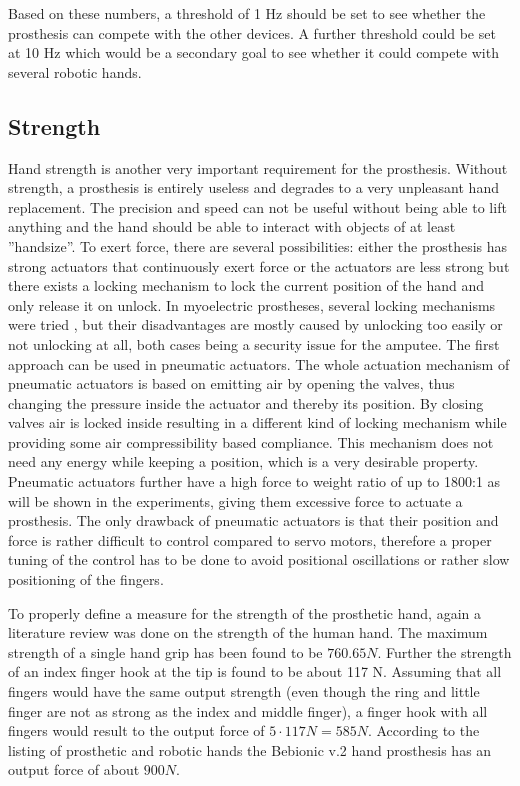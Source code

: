 \documentclass[main]{subfiles}
\begin{document}
Based on these numbers, a threshold of 1 Hz should be set to see whether the prosthesis can compete with the other devices. A further threshold could be set at 10 Hz which would be a secondary goal to see whether it could compete with several robotic hands.

\subsection{Strength}

Hand strength is another very important requirement for the prosthesis. Without strength, a prosthesis is entirely useless and degrades to a very unpleasant hand replacement. The precision and speed can not be useful without being able to lift anything and the hand should be able to interact with objects of at least ''handsize''. To exert force, there are several possibilities: either the prosthesis has strong actuators that continuously exert force or the actuators are less strong but there exists a locking mechanism to lock the current position of the hand and only release it on unlock. In myoelectric prostheses, several locking mechanisms were tried \cite{locking1}, but their disadvantages are mostly caused by unlocking too easily or not unlocking at all, both cases being a security issue for the amputee. The first approach can be used in pneumatic actuators. The whole actuation mechanism of pneumatic actuators is based on emitting air by opening the valves, thus changing the pressure inside the actuator and thereby its position. By closing valves air is locked inside resulting in a different kind of locking mechanism while providing some air compressibility based compliance. This mechanism does not need any energy while keeping a position, which is a very desirable property. Pneumatic actuators further have a high force to weight ratio of up to 1800:1 as will be shown in the experiments, giving them excessive force to actuate a prosthesis. The only drawback of pneumatic actuators is that their position and force is rather difficult to control compared to servo motors, therefore a proper tuning of the control has to be done to avoid positional oscillations or rather slow positioning of the fingers.

To properly define a measure for the strength of the prosthetic hand, again a literature review was done on the strength of the human hand. The maximum strength of a single hand grip has been found to be $760.65 N$. Further the strength of an index finger hook at the tip is found to be about 117 N. Assuming that all fingers would have the same output strength (even though the ring and little finger are not as strong as the index and middle finger), a finger hook with all fingers would result to the output force of $5 \cdot 117 N = 585 N$.  According to the listing of prosthetic and robotic hands the Bebionic v.2 hand prosthesis has an output force of about $900 N$.
\end{document}

